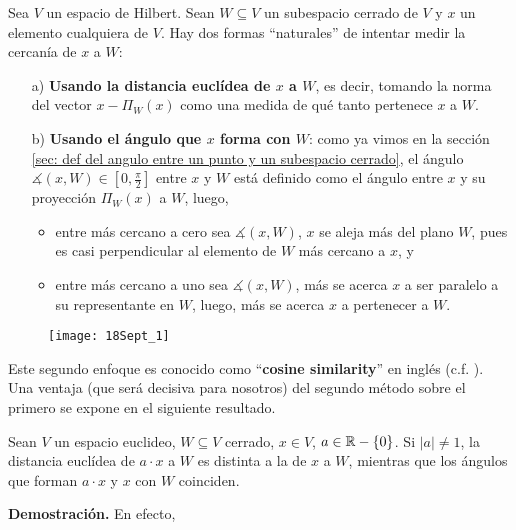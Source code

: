 Sea $V$ un espacio de Hilbert.
Sean $W \subseteq V$ un subespacio cerrado de $V$ y 
$x$ un elemento cualquiera de $V$. Hay dos formas ``naturales''
de intentar medir la cercanía de $x$ a $W$:
\begin{itemize}
\item[a)] \textbf{Usando la distancia euclídea
de $x$ a $W$}, es decir, tomando la norma del vector
$x - \Pi_{W}(x)$ como una medida
de qué tanto pertenece $x$ a $W$.
\item[b)] \textbf{Usando el ángulo que $x$ forma con $W$}: como ya
vimos en la sección 
\ref{sec: def del angulo entre un punto y un subespacio cerrado}, el ángulo 
$\measuredangle (x, W) \in [0, \frac{\pi}{2}]$
entre $x$ y $W$
está definido como el ángulo entre $x$ y su proyección
$\Pi_{W}(x)$ a $W$, luego, 
	\begin{itemize}
		\item entre más cercano a cero sea $\measuredangle (x, W)$,
		$x$ se aleja más del plano $W$, pues es casi perpendicular 
		al elemento de $W$ más cercano a $x$, y
		
		\item entre más cercano a uno sea $\measuredangle (x, W)$,
		más se acerca $x$ a ser paralelo a su representante en $W$,
		luego, más se acerca $x$ a pertenecer a $W$.
	\end{itemize}
\end{itemize}

\begin{figure}[H]
	\centering
	\texttt{[image: 18Sept\_1]} 
\end{figure}	

Este segundo
enfoque es conocido como ``\textbf{cosine similarity}'' en
inglés (c.f. \cite{cosineSim}). Una ventaja (que será decisiva
para nosotros) del segundo método sobre el primero se
expone en el siguiente resultado.


\begin{prop}
\label{prop: angulo se conserva bajo mult. esc.}
Sean $V$ un espacio euclideo, $W \subseteq V$ cerrado, $x \in V$,
$a \in \mathbb{R} - \{ 0 \}$. Si $|a| \neq 1$, la distancia euclídea 
de $a \cdot x$ a $W$ es distinta
a la de $x$ a $W$, mientras que los 
ángulos que forman $a \cdot x$ y $x$
con $W$ coinciden.
\end{prop}
\noindent
\textbf{Demostración.}
En efecto, 

